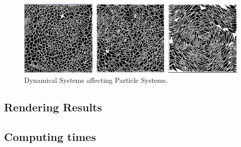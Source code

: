 \documentclass[oneside,a4paper,english,links]{amca}
\begin{document}
\begin{figure}[htb!]
\centerline{\includegraphics[scale=0.21]{fig4}}
\caption{Dynamical Systems affecting Particle Systems.}
\label{fg:fig4}
\end{figure}


\subsection{Rendering Results}
\subsection{Computing times}









\end{document}

